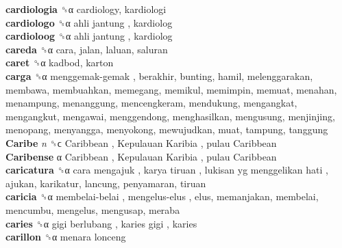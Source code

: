 \textbf{cardiologia} ␝α  cardiology, kardiologi  \\
\textbf{cardiologo} ␝α   ahli jantung , kardiolog  \\
\textbf{cardioloog} ␝α   ahli jantung , kardiolog  \\
\textbf{careda} ␝α  cara, jalan, laluan, saluran  \\
\textbf{caret} ␝α  kadbod, karton  \\
\textbf{carga} ␝α   menggemak-gemak , berakhir, bunting, hamil, melenggarakan, membawa, membuahkan, memegang, memikul, memimpin, memuat, menahan, menampung, menanggung, mencengkeram, mendukung, mengangkat, mengangkut, mengawai, menggendong, menghasilkan, mengusung, menjinjing, menopang, menyangga, menyokong, mewujudkan, muat, tampung, tanggung  \\
\textbf{Caribe} \emph{n}  ␝ϲ   Caribbean ,  Kepulauan Karibia ,  pulau Caribbean   \\
\textbf{Caribense} α   Caribbean ,  Kepulauan Karibia ,  pulau Caribbean   \\
\textbf{caricatura} ␝α   cara mengajuk ,  karya tiruan ,  lukisan yg menggelikan hati , ajukan, karikatur, lancung, penyamaran, tiruan  \\
\textbf{caricia} ␝α   membelai-belai ,  mengelus-elus , elus, memanjakan, membelai, mencumbu, mengelus, mengusap, meraba  \\
\textbf{caries} ␝α   gigi berlubang ,  karies gigi , karies  \\
\textbf{carillon} ␝α   menara lonceng   \\
